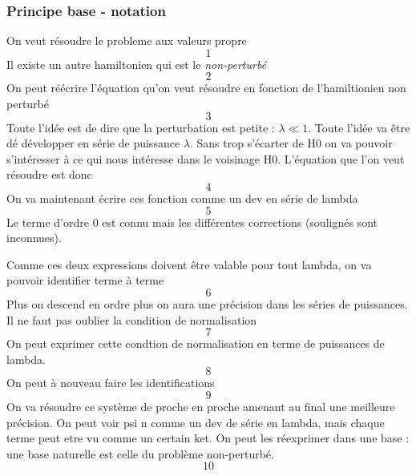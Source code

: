 		\subsubsection{Principe base - notation}
		On veut résoudre le probleme aux valeurs propre 
		\begin{equation}
		1
		\end{equation}
		Il existe un autre hamiltonien qui est le \textit{non-perturbé}
		\begin{equation}
		2
		\end{equation}
		On peut réécrire l'équation qu'on veut résoudre en fonction de 
		l'hamiltionien non perturbé
		\begin{equation}
		3
		\end{equation}
		Toute l'idée est de dire que la perturbation est petite : $\lambda\ll 
		1$.  Toute l'idée va être dé développer en série de puissance 
		$\lambda$. Sans trop s'écarter de H0 on va pouvoir s'intéresser à 
		ce qui nous intéresse dans le voisinage H0. L'équation que l'on veut 
		résoudre est donc
		\begin{equation}
		4
		\end{equation}
		On va maintenant écrire ces fonction comme un dev en série de lambda
		\begin{equation}
		5
		\end{equation}
		Le terme d'ordre 0 est connu mais les différentes corrections
		(soulignés sont inconnues). 
		
		Comme ces deux expressions doivent être valable pour tout lambda, on 
		va pouvoir identifier terme à terme
		\begin{equation}
		6
		\end{equation}
		Plus on descend en ordre plus on aura une précision dans les séries
		de puissances. Il ne faut pas oublier la condition de normalisation 
		\begin{equation}
		7
		\end{equation}
		On peut exprimer cette condtion de normalisation en terme de 
		puissances de lambda.
		\begin{equation}
		8
		\end{equation}
		On peut à nouveau faire les identifications
		\begin{equation}
		9
		\end{equation}
		On va résoudre ce système de proche en proche amenant au final une 
		meilleure précision. On peut voir psi n comme un dev de série en 
		lambda, mais chaque terme peut etre vu comme un certain ket. On peut 
		les réexprimer dans une base : une base naturelle est celle du 
		problème non-perturbé. 
		\begin{equation}
		10
		\end{equation}
		
